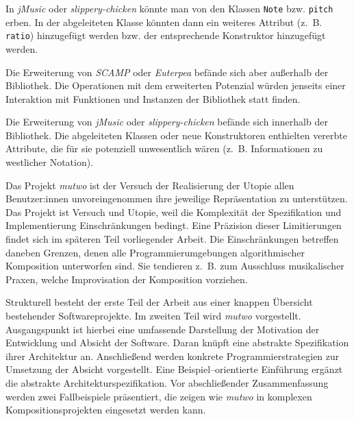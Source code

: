 \documentclass[12pt,a4paper,ngerman]{article}
\begin{document}
In \emph{jMusic} oder \emph{slippery-chicken} könnte man von den Klassen \texttt{Note} bzw. \texttt{pitch} erben.
In der abgeleiteten Klasse könnten dann ein weiteres Attribut (z.~B. \texttt{ratio}) hinzugefügt werden bzw. der entsprechende Konstruktor hinzugefügt werden.

\smallskip

Die Erweiterung von \emph{SCAMP} oder \emph{Euterpea} befände sich aber außerhalb der Bibliothek.
Die Operationen mit dem erweiterten Potenzial würden jenseits einer Interaktion mit Funktionen und Instanzen der Bibliothek statt finden.

\smallskip

Die Erweiterung von \emph{jMusic} oder \emph{slippery-chicken} befände sich innerhalb der Bibliothek.
Die abgeleiteten Klassen oder neue Konstruktoren enthielten vererbte Attribute, die für sie potenziell unwesentlich wären (z.~B. Informationen zu westlicher Notation).

\bigskip

Das Projekt \emph{mutwo} ist der Versuch der Realisierung der Utopie allen Benutzer:innen unvoreingenommen ihre jeweilige Repräsentation zu unterstützen.
Das Projekt ist Versuch und Utopie, weil die Komplexität der Spezifikation und Implementierung Einschränkungen bedingt.
Eine Präzision dieser Limitierungen findet sich im späteren Teil vorliegender Arbeit.
Die Einschränkungen betreffen daneben Grenzen, denen alle Programmierumgebungen algorithmischer Komposition unterworfen sind.
Sie tendieren z.~B. zum Ausschluss musikalischer Praxen, welche Improvisation der Komposition vorziehen.

\bigskip

Strukturell besteht der erste Teil der Arbeit aus einer knappen Übersicht bestehender Softwareprojekte.
Im zweiten Teil wird \emph{mutwo} vorgestellt.
Ausgangspunkt ist hierbei eine umfassende Darstellung der Motivation der Entwicklung und Absicht der Software.
Daran knüpft eine abstrakte Spezifikation ihrer Architektur an.
Anschließend werden konkrete Programmierstrategien zur Umsetzung der Absicht vorgestellt.
Eine Beispiel--orientierte Einführung ergänzt die abstrakte Architekturspezifikation.
Vor abschließender Zusammenfassung werden zwei Fallbeispiele präsentiert, die zeigen wie \emph{mutwo} in komplexen Kompositionsprojekten eingesetzt werden kann.

%
\end{document}
